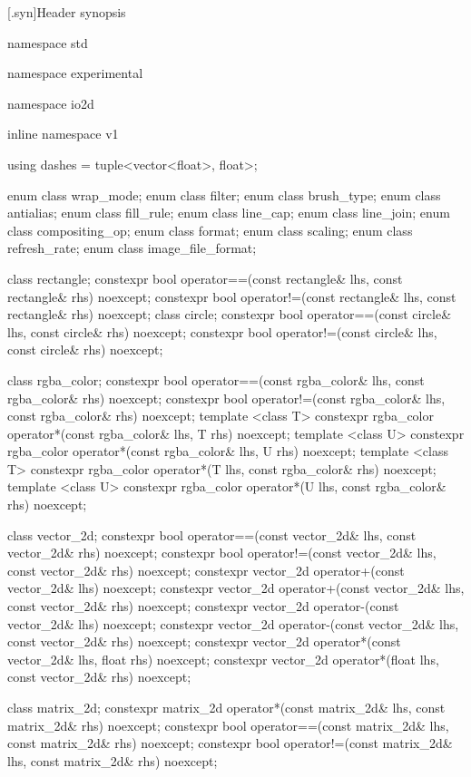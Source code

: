 [\iotwod.syn]{Header  synopsis}

%
%
\begin{codeblock}

namespace std { namespace experimental {
  namespace io2d { inline namespace v1 {

  using dashes = tuple<vector<float>, float>;

  enum class wrap_mode;
  enum class filter;
  enum class brush_type;
  enum class antialias;
  enum class fill_rule;
  enum class line_cap;
  enum class line_join;
  enum class compositing_op;
  enum class format;
  enum class scaling;
  enum class refresh_rate;
  enum class image_file_format;

  class rectangle;
  constexpr bool operator==(const rectangle& lhs, const rectangle& rhs) 
    noexcept;
  constexpr bool operator!=(const rectangle& lhs, const rectangle& rhs) 
    noexcept;
  class circle;
  constexpr bool operator==(const circle& lhs, const circle& rhs) noexcept;
  constexpr bool operator!=(const circle& lhs, const circle& rhs) noexcept;

  class rgba_color;
  constexpr bool operator==(const rgba_color& lhs, const rgba_color& rhs) 
    noexcept;
  constexpr bool operator!=(const rgba_color& lhs, const rgba_color& rhs) 
    noexcept;
  template <class T>
  constexpr rgba_color operator*(const rgba_color& lhs, T rhs) noexcept;
  template <class U>
  constexpr rgba_color operator*(const rgba_color& lhs, U rhs) noexcept;
  template <class T>
  constexpr rgba_color operator*(T lhs, const rgba_color& rhs) noexcept;
  template <class U>
  constexpr rgba_color operator*(U lhs, const rgba_color& rhs) noexcept;

  class vector_2d;
  constexpr bool operator==(const vector_2d& lhs, const vector_2d& rhs) 
    noexcept;
  constexpr bool operator!=(const vector_2d& lhs, const vector_2d& rhs) 
    noexcept;
  constexpr vector_2d operator+(const vector_2d& lhs) noexcept;
  constexpr vector_2d operator+(const vector_2d& lhs, const vector_2d& rhs) 
    noexcept;
  constexpr vector_2d operator-(const vector_2d& lhs) noexcept;
  constexpr vector_2d operator-(const vector_2d& lhs, const vector_2d& rhs) 
    noexcept;
  constexpr vector_2d operator*(const vector_2d& lhs, float rhs) noexcept;
  constexpr vector_2d operator*(float lhs, const vector_2d& rhs) noexcept;

  class matrix_2d;
  constexpr matrix_2d operator*(const matrix_2d& lhs, const matrix_2d& rhs) 
    noexcept;
  constexpr bool operator==(const matrix_2d& lhs, const matrix_2d& rhs) 
    noexcept;
  constexpr bool operator!=(const matrix_2d& lhs, const matrix_2d& rhs) 
    noexcept;

}}}}
\end{codeblock}
